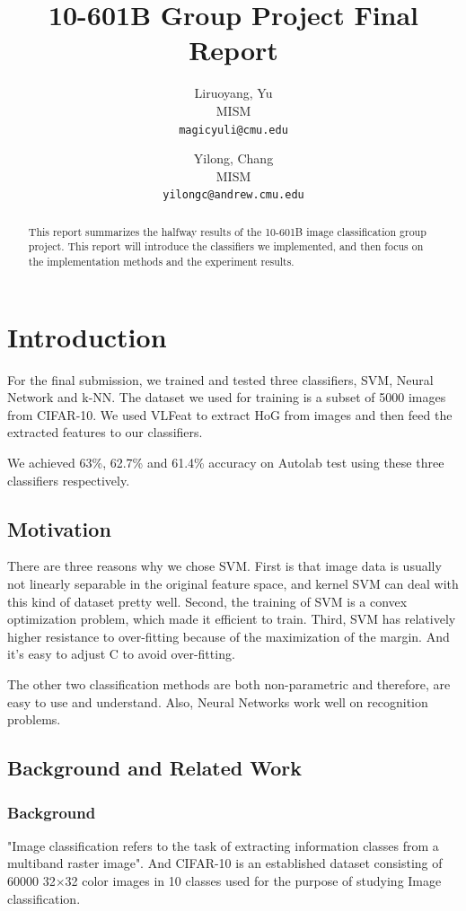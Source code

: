 \documentclass{article} %
\title{10-601B Group Project Final Report}
\author{
Liruoyang, Yu\\
MISM\\
\texttt{magicyuli@cmu.edu}
\and
Yilong, Chang\\
MISM\\
\texttt{yilongc@andrew.cmu.edu}
}
\begin{document}
\maketitle
\begin{abstract}
This report summarizes the halfway results of the 10-601B image classification group project. This report will introduce the classifiers we implemented, and then focus on the implementation methods and the experiment results.
\end{abstract}

\section{Introduction}
For the final submission, we trained and tested three classifiers, SVM,  Neural Network and k-NN. The dataset we used for training is a subset of 5000 images from CIFAR-10. We used VLFeat to extract HoG from images and then feed the extracted features to our classifiers.

We achieved 63\%, 62.7\% and 61.4\% accuracy on Autolab test using these three classifiers respectively.

\subsection{Motivation}

There are three reasons why we chose SVM. First is that image data is usually not linearly separable in the original feature space, and kernel SVM can deal with this kind of dataset pretty well. Second, the training of SVM is a convex optimization problem, which made it efficient to train. Third, SVM has relatively higher resistance to over-fitting because of the maximization of the margin. And it's easy to adjust C to avoid over-fitting.

The other two classification methods are both non-parametric and therefore, are easy to use and understand. Also, Neural Networks work well on recognition problems.

\subsection{Background and Related Work}
\subsubsection{Background}
"Image classification refers to the task of extracting information classes from a multiband raster image". And CIFAR-10 is an established dataset consisting of 60000 32$\times$32 color images in 10 classes used for the purpose of studying Image classification. 
\end{document}
